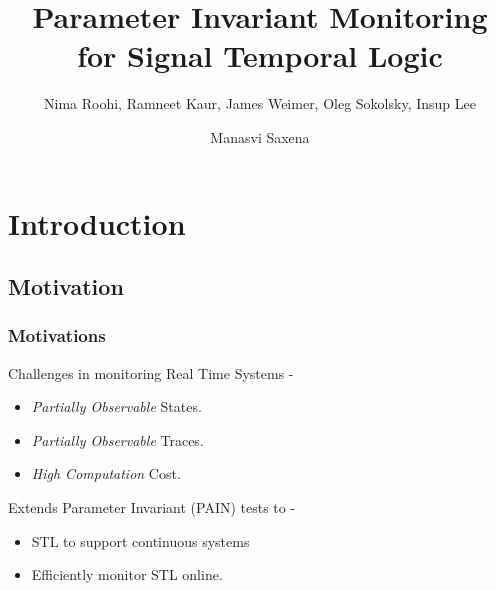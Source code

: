 \documentclass{beamer}
\title[Parameter Invariant Monitoring for STL]{Parameter Invariant Monitoring for Signal Temporal Logic}
\subtitle{Nima Roohi, Ramneet Kaur, James Weimer, Oleg Sokolsky, Insup Lee}
\author{Manasvi Saxena}
\date{}
\begin{document}
\frame{\titlepage}

\section{Introduction}
\subsection{Motivation}

\begin{frame}
    \frametitle{Motivations}

    Challenges in monitoring Real Time Systems -
    \begin{itemize}
        \item \textit{Partially Observable} States.
        \item \textit{Partially Observable} Traces.
        \item \textit{High Computation} Cost.
    \end{itemize}

    \pause

    Extends Parameter Invariant (PAIN) tests to -
    \begin{itemize}
        \item STL to support continuous systems
        \item Efficiently monitor STL online.
    \end{itemize}

\end{frame}
\end{document}
